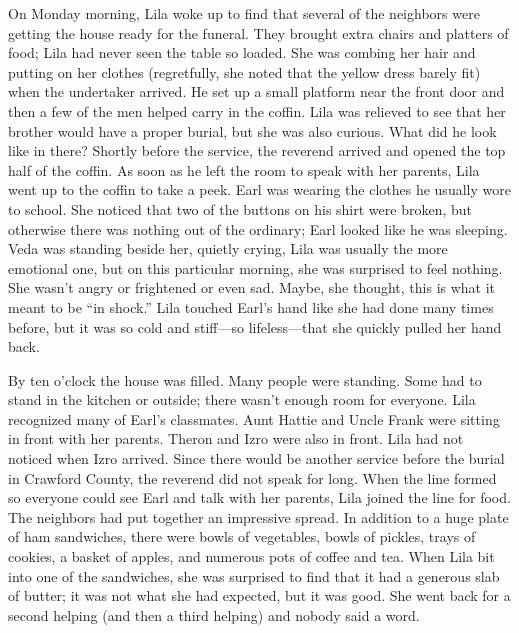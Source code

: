 \documentclass[
  american,
  letterpaper,
]{book}
\begin{document}
On Monday morning, Lila woke up to find that several of the neighbors
were getting the house ready for the funeral. They brought extra chairs
and platters of food; Lila had never seen the table so loaded. She was
combing her hair and putting on her clothes (regretfully, she noted that
the yellow dress barely fit) when the undertaker arrived. He set up a
small platform near the front door and then a few of the men helped
carry in the coffin. Lila was relieved to see that her brother would
have a proper burial, but she was also curious. What did he look like in
there? Shortly before the service, the reverend arrived and opened the
top half of the coffin. As soon as he left the room to speak with her
parents, Lila went up to the coffin to take a peek. Earl was wearing the
clothes he usually wore to school. She noticed that two of the buttons
on his shirt were broken, but otherwise there was nothing out of the
ordinary; Earl looked like he was sleeping. Veda was standing beside
her, quietly crying, Lila was usually the more emotional one, but on
this particular morning, she was surprised to feel nothing. She wasn't
angry or frightened or even sad. Maybe, she thought, this is what it
meant to be ``in shock.'' Lila touched Earl's hand like she had done
many times before, but it was so cold and stiff---so lifeless---that she
quickly pulled her hand back.

By ten o'clock the house was filled. Many people were standing. Some had
to stand in the kitchen or outside; there wasn't enough room for
everyone. Lila recognized many of Earl's classmates. Aunt Hattie and
Uncle Frank were sitting in front with her parents. Theron and Izro were
also in front. Lila had not noticed when Izro arrived. Since there would
be another service before the burial in Crawford County, the reverend
did not speak for long. When the line formed so everyone could see Earl
and talk with her parents, Lila joined the line for food. The neighbors
had put together an impressive spread. In addition to a huge plate of
ham sandwiches, there were bowls of vegetables, bowls of pickles, trays
of cookies, a basket of apples, and numerous pots of coffee and tea.
When Lila bit into one of the sandwiches, she was surprised to find that
it had a generous slab of butter; it was not what she had expected, but
it was good. She went back for a second helping (and then a third
helping) and nobody said a word.
\end{document}
